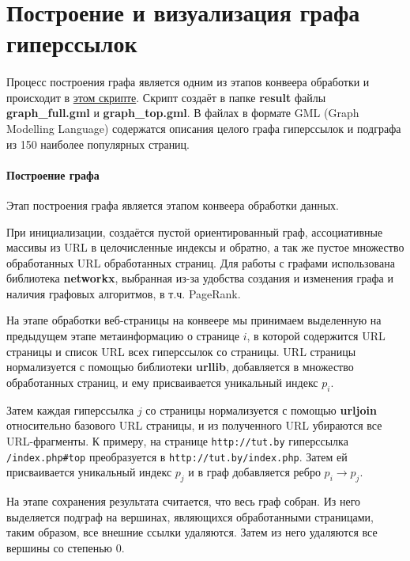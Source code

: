 \section{Построение и визуализация графа гиперссылок}
\paragraph{}
Процесс построения графа является одним из этапов конвеера обработки и происходит в \href{https://github.com/vasalf/hse-web-search-homework/blob/master/1/pipeline/graph_builder.py}{этом скрипте}. Скрипт создаёт в папке \textbf{result} файлы \textbf{graph\_full.gml} и \textbf{graph\_top.gml}. В файлах в формате GML (Graph Modelling Language) содержатся описания целого графа гиперссылок и подграфа из 150 наиболее популярных страниц.
\paragraph{Построение графа}

Этап построения графа является этапом конвеера обработки данных.

 При инициализации, создаётся пустой ориентированный граф, ассоциативные массивы из URL в целочисленные индексы и обратно, а так же пустое множество обработанных URL обработанных страниц. Для работы с графами использована библиотека \textbf{networkx}, выбранная из-за удобства создания и изменения графа и наличия графовых алгоритмов, в т.ч. PageRank.
 
 На этапе обработки веб-страницы на конвеере мы принимаем выделенную на предыдущем этапе метаинформацию о странице $i$, в которой содержится URL страницы и список URL всех гиперссылок со страницы. URL страницы нормализуется с помощью библиотеки \textbf{urllib}, добавляется в множество обработанных страниц, и ему присваивается уникальный индекс $p_i$. 
 
 Затем каждая гиперссылка $j$ со страницы нормализуется с помощью \textbf{urljoin} относительно базового URL страницы, и из полученного URL убираются все URL-фрагменты. К примеру, на странице \texttt{http://tut.by} гиперссылка \texttt{/index.php\#top} преобразуется в  \texttt{http://tut.by/index.php}. Затем ей присваивается уникальный индекс $p_j$ и в граф добавляется ребро $p_i \rightarrow p_j$.
 
 На этапе сохранения результата считается, что весь граф собран. Из него выделяется подграф на вершинах, являющихся обработанными страницами, таким образом, все внешние ссылки удаляются. Затем из него удаляются все вершины со степенью 0.
 

